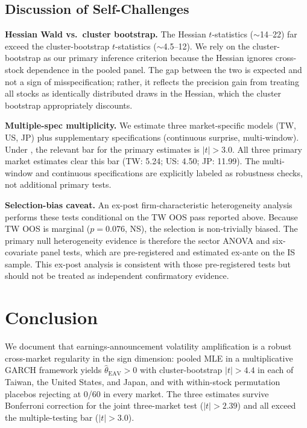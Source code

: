 \documentclass[12pt,a4paper]{article}
\begin{document}
\subsection{Discussion of Self-Challenges}

\textbf{Hessian Wald vs.\ cluster bootstrap.}
The Hessian $t$-statistics ($\sim$14--22) far exceed the cluster-bootstrap
$t$-statistics ($\sim$4.5--12). We rely on the cluster-bootstrap as our
primary inference criterion because the Hessian ignores cross-stock
dependence in the pooled panel. The gap between the two is expected and not
a sign of misspecification; rather, it reflects the precision gain from
treating all stocks as identically distributed draws in the Hessian,
which the cluster bootstrap appropriately discounts.

\textbf{Multiple-spec multiplicity.}
We estimate three market-specific models (TW, US, JP) plus supplementary
specifications (continuous surprise, multi-window). Under
\citet{harvey2016}, the relevant bar for the primary estimates is
$|t| > 3.0$. All three primary market estimates clear this bar
(TW: 5.24; US: 4.50; JP: 11.99). The multi-window and continuous
specifications are explicitly labeled as robustness checks, not additional
primary tests.

\textbf{Selection-bias caveat.}
An ex-post firm-characteristic heterogeneity analysis performs these tests
conditional on the TW OOS pass reported above. Because TW OOS is
marginal ($p = 0.076$, NS), the selection is non-trivially biased.
The primary null heterogeneity evidence is therefore the sector ANOVA and six-covariate panel tests,
which are pre-registered and estimated ex-ante on the IS sample.
This ex-post analysis is consistent with those pre-registered tests but should not be
treated as independent confirmatory evidence.

\section{Conclusion}
\label{sec:conclusion}

We document that earnings-announcement volatility amplification is a
robust cross-market regularity in the sign dimension: pooled MLE in a
multiplicative GARCH framework yields $\hat{\theta}_{\mathrm{EAV}} > 0$
with cluster-bootstrap $|t| > 4.4$ in each of Taiwan, the United States,
and Japan, and with within-stock permutation placebos rejecting at 0/60
in every market. The three estimates survive Bonferroni correction for the
joint three-market test ($|t| > 2.39$) and all exceed the
\citet{harvey2016} multiple-testing bar ($|t| > 3.0$).
\end{document}
